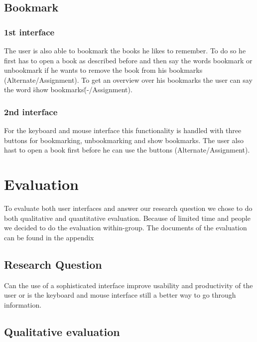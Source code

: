 \documentclass[a4paper, 10pt]{article}
\begin{document}
	\subsection{Bookmark}
	
	\subsubsection{1st interface}
	
	\par{The user is also able to bookmark the books he likes to remember. To do so he first has to open a book as described before and then say the words bookmark or unbookmark if he wants to remove the book from his bookmarks (Alternate/Assignment). To get an overview over his bookmarks the user can say the word \"show bookmarks\" (-/Assignment).}
	
	\subsubsection{2nd interface}
	
	\par{For the keyboard and mouse interface this functionality is handled with three buttons for bookmarking, unbookmarking and show bookmarks. The user also hast to open a book first before he can use the buttons (Alternate/Assignment).}
	
	
	\section{Evaluation}
	
	\par{To evaluate both user interfaces and answer our research question we chose to do both qualitative and quantitative evaluation. Because of limited time and people we decided to do the evaluation within-group. The documents of the evaluation can be found in the appendix}
	
	\subsection{Research Question}
	
	\par{Can the use of a sophisticated interface improve usability and productivity of the user or is the keyboard and mouse interface still a better way to go through information.}
	
	\subsection{Qualitative evaluation}
	
\end{document}
